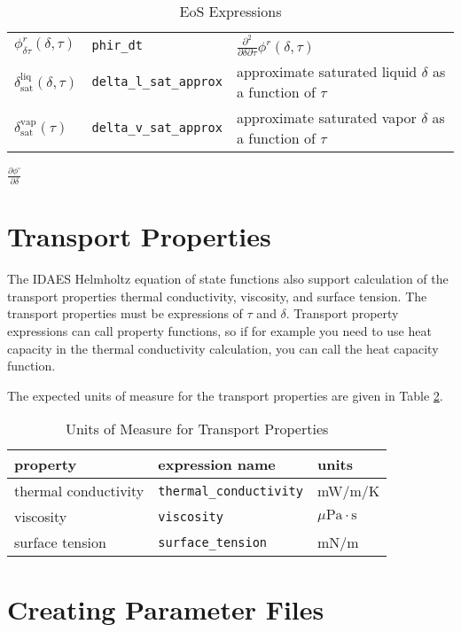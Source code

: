 \documentclass[oneside]{book}
\begin{document}
\begin{table}[h!]
\begin{tabular}{ l l l }
$\phi_{\delta\tau}^r(\delta, \tau)$ & \texttt{phir\_dt} & $\frac{\partial^2}{\partial \delta \partial \tau} \phi^r(\delta, \tau) $ \\[1ex]
$\delta^\text{liq}_\text{sat}(\delta, \tau)$ & \texttt{delta\_l\_sat\_approx} & approximate saturated liquid $\delta$ as a function of $\tau$  \\[1ex]
$\delta_{\text{sat}}^{\text{vap}}(\tau)$ & \texttt{delta\_v\_sat\_approx} & approximate saturated vapor $\delta$ as a function of $\tau$  \\[1ex]
 \hline    
\end{tabular}
\caption{EoS Expressions}
\label{table:eos_expressions}
\end{table}

$\frac{\partial \phi^\circ}{\partial \delta}$

\section{Transport Properties}

The IDAES Helmholtz equation of state functions also support calculation of the transport properties thermal conductivity, viscosity, and surface tension. The transport properties must be expressions of $\tau$ and $\delta$.  Transport property expressions can call property functions, so if for example you need to use heat capacity in the thermal conductivity calculation, you can call the heat capacity function. 

The expected units of measure for the transport properties are given in Table \ref{table:transport_units}.

\begin{table}[h!]
\centering
\begin{tabular}{ l l l }
\hline
property & expression name & units  \\
\hline
\hline
 thermal conductivity &  \texttt{thermal\_conductivity} & mW/m/K  \\  
 viscosity & \texttt{viscosity} & $ \mu \text{Pa} \cdot \text{s} $  \\
 surface tension & \texttt{surface\_tension} &  mN/m   \\
 \hline    
\end{tabular}
\caption{Units of Measure for Transport Properties}
\label{table:transport_units}
\end{table}

\section{Creating Parameter Files}
\end{document}
